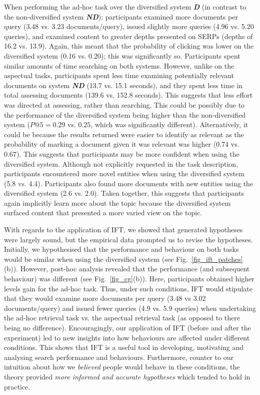 When performing the ad-hoc task over the diversified system \textbf{\emph{D}} (in contrast to the non-diversified system \textbf{\emph{ND}}): participants examined more documents per query (3.48 vs. 3.23 documents/query), issued slightly more queries (4.96 vs. 5.20 queries), and examined content to greater depths presented on SERPs (depths of 16.2 vs. 13.9). Again, this meant that the probability of clicking was lower on the diversified system (0.16 vs. 0.20); this was significantly so. Participants spent similar amounts of time searching on both systems. However, unlike on the aspectual tasks, participants spent less time examining potentially relevant documents on system \textbf{\emph{ND}} (13.7 vs. 15.1 seconds), and they spent less time in total assessing documents (139.6 vs, 152.8 seconds). This suggests that less effort was directed at assessing, rather than searching. This could be possibly due to the performance of the diversified system being higher than the non-diversified system ($P@5=0.29$ vs. $0.25$, which was significantly different). Alternatively, it could be because the results returned were easier to identify as relevant as the probability of marking a document given it was relevant was higher (0.74 vs. 0.67). This suggests that participants may be more confident when using the diversified system. Although not explicitly requested in the task description, participants encountered more novel entities when using the diversified system (5.8 vs. 4.4). Participants also found more documents with new entities using the diversified system (2.6 vs. 2.0). Taken together, this suggests that participants again implicitly learn more about the topic because the diversified system surfaced content that presented a more varied view on the topic.


With regards to the application of IFT, we showed that generated hypotheses were largely sound, but the empirical data prompted us to revise the hypotheses. Initially, we hypothesised that the performance and behaviour on both tasks would be similar when using the diversified system (see Fig.~\ref{fig_ift_patches}(b)). However, post-hoc analysis revealed that the performance (and subsequent behaviour) was different (see Fig.~\ref{fig_cg}(b)). Here, participants obtained higher levels gain for the ad-hoc task. Thus, under such conditions, IFT would stipulate that they would examine more documents per query (3.48 vs 3.02 documents/query) and issued fewer queries (4.9 vs. 5.9 queries) when undertaking the ad-hoc retrieval task vs. the aspectual retrieval task (as opposed to there being no difference). Encouragingly, our application of IFT (before and after the experiment) led to new insights into how behaviours are affected under different conditions. This shows that IFT is a useful tool in developing, motivating and analysing search performance and behaviours. Furthermore, counter to our intuition about how we \emph{believed} people would behave in these conditions, the theory provided \emph{more informed and accurate hypotheses} which tended to hold in practice.

